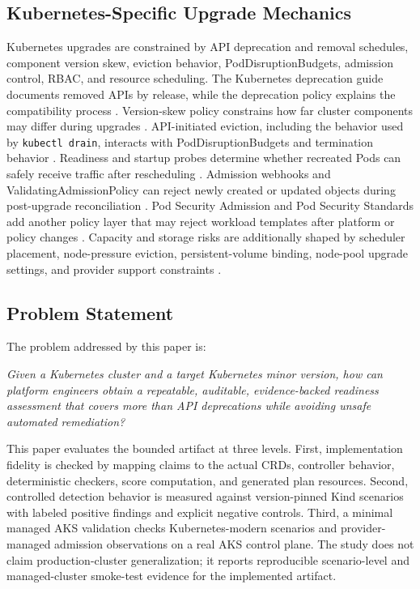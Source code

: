 \documentclass[10pt,journal]{IEEEtran}
\newcommand{\code}[1]{\texttt{#1}}
\begin{document}
\subsection{Kubernetes-Specific Upgrade Mechanics}
Kubernetes upgrades are constrained by API deprecation and removal schedules, component version skew, eviction behavior, PodDisruptionBudgets, admission control, RBAC, and resource scheduling. The Kubernetes deprecation guide documents removed APIs by release, while the deprecation policy explains the compatibility process \cite{kubernetesDeprecationPolicy,kubernetesDeprecationGuide}. Version-skew policy constrains how far cluster components may differ during upgrades \cite{kubernetesVersionSkew}. API-initiated eviction, including the behavior used by \code{kubectl drain}, interacts with PodDisruptionBudgets and termination behavior \cite{kubernetesEviction,kubernetesDisruptions,kubernetesPdbTask}. Readiness and startup probes determine whether recreated Pods can safely receive traffic after rescheduling \cite{kubernetesProbes,kubernetesPodLifecycle}. Admission webhooks and ValidatingAdmissionPolicy can reject newly created or updated objects during post-upgrade reconciliation \cite{kubernetesAdmissionWebhooks,kubernetesAdmissionWebhooksGoodPractices,kubernetesValidatingAdmissionPolicy}. Pod Security Admission and Pod Security Standards add another policy layer that may reject workload templates after platform or policy changes \cite{kubernetesPodSecurityAdmission,kubernetesPodSecurityStandards}. Capacity and storage risks are additionally shaped by scheduler placement, node-pressure eviction, persistent-volume binding, node-pool upgrade settings, and provider support constraints \cite{kubernetesSchedulingEviction,kubernetesNodePressureEviction,kubernetesPersistentVolumes,aksUpgradeOptions,aksNodeImage,aksSupportPolicies,aksNodePools}.

\subsection{Problem Statement}
The problem addressed by this paper is:

\emph{Given a Kubernetes cluster and a target Kubernetes minor version, how can platform engineers obtain a repeatable, auditable, evidence-backed readiness assessment that covers more than API deprecations while avoiding unsafe automated remediation?}

This paper evaluates the bounded artifact at three levels. First, implementation fidelity is checked by mapping claims to the actual CRDs, controller behavior, deterministic checkers, score computation, and generated plan resources. Second, controlled detection behavior is measured against version-pinned Kind scenarios with labeled positive findings and explicit negative controls. Third, a minimal managed AKS validation checks Kubernetes-modern scenarios and provider-managed admission observations on a real AKS control plane. The study does not claim production-cluster generalization; it reports reproducible scenario-level and managed-cluster smoke-test evidence for the implemented artifact.
\end{document}
